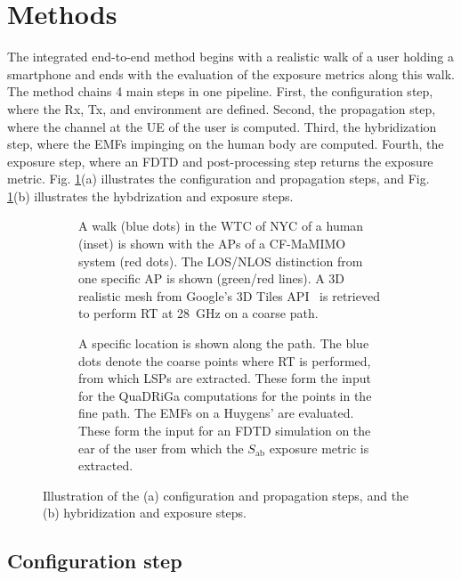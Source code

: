 \documentclass{IEEEtran}
\begin{document}
\section{Methods}
The integrated end-to-end method begins with a realistic walk of a user holding a smartphone and ends with the evaluation of the exposure metrics along this walk. The method chains 4 main steps in one pipeline. First, the configuration step, where the Rx, Tx, and environment are defined. Second, the propagation step, where the channel at the \gls{UE} of the user is computed. Third, the hybridization step, where the \glspl{EMF} impinging on the human body are computed. Fourth, the exposure step, where an FDTD and post-processing step returns the exposure metric. Fig. \ref{fig:nyc_config}(a) illustrates the configuration and propagation steps, and Fig. \ref{fig:nyc_config}(b) illustrates the hybdrization and exposure steps.
\begin{figure}[h!]
    \centering
    \begin{subfigure}[b]{\linewidth}
        \centering
        
        \caption{A walk (blue dots) in the WTC of \gls{NYC} of a human (inset) is shown with the \glspl{AP} of a \gls{CF-MaMIMO} system (red dots). The \gls{LOS}/\gls{NLOS} distinction from one specific \gls{AP} is shown (green/red lines). A 3D realistic mesh from Google's 3D Tiles API~\cite{NYCenv} is retrieved to perform RT at 28~GHz on a coarse path.}
    \end{subfigure}
    \begin{subfigure}[b]{\linewidth}
        \centering
        
        \caption{A specific location is shown along the path. The blue dots denote the coarse points where RT is performed, from which LSPs are extracted. These form the input for the QuaDRiGa computations for the points in the fine path. The \glspl{EMF} on a Huygens' are evaluated. These form the input for an FDTD simulation on the ear of the user from which the $S_\mathrm{ab}$ exposure metric is extracted.}
    \end{subfigure}
    \caption{Illustration of the (a) configuration and propagation steps, and the (b) hybridization and exposure steps.}
    \label{fig:nyc_config}
\end{figure} 

\subsection{Configuration step}
\end{document}
